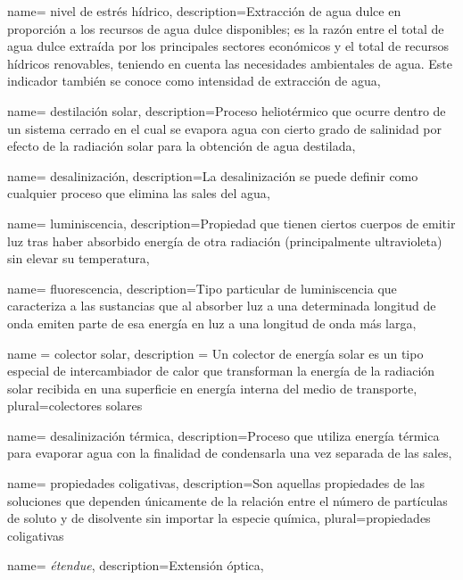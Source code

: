{
	name= {nivel de estrés hídrico},
	description={Extracción de agua dulce en proporción a los recursos de agua dulce disponibles; es la razón entre el total de agua dulce extraída por los principales sectores económicos y el total de recursos hídricos renovables, teniendo en cuenta las necesidades ambientales de agua. Este indicador también se conoce como intensidad de extracción de agua},
}

{
	name= {destilación solar},
	description={Proceso heliotérmico que ocurre dentro de un sistema cerrado en el cual se evapora agua con cierto grado de salinidad por efecto de la radiación solar para la obtención de agua destilada},
}

{
	name= {desalinización},
	description={La desalinización se puede definir como cualquier proceso que elimina las sales del agua},
}

{
	name= {luminiscencia},
	description={Propiedad que tienen ciertos cuerpos de emitir luz tras haber absorbido energía de otra radiación (principalmente ultravioleta) sin elevar su temperatura},
}

{
	name= {fluorescencia},
	description={Tipo particular de \gls{luminiscencia} que caracteriza a las sustancias que al absorber luz a una determinada longitud de onda emiten parte de esa energía en luz a una longitud de onda más larga},
}

{
	name = {colector solar},
	description = {Un colector de energía solar es un tipo especial de intercambiador de calor que transforman la energía de la radiación solar recibida en una superficie en energía interna del medio de transporte},
	plural={colectores solares}
}

{
	name= {desalinización térmica},
	description={Proceso que utiliza energía térmica para evaporar agua con la finalidad de condensarla una vez separada de las sales},
}

{
	name= {propiedades coligativas},
	description={Son aquellas propiedades de las soluciones que dependen únicamente de la relación entre el número de partículas de soluto y de disolvente sin importar la especie química},
	plural={propiedades coligativas}
}

{
	name= {\textit{étendue}},
	description={Extensión óptica},
}
